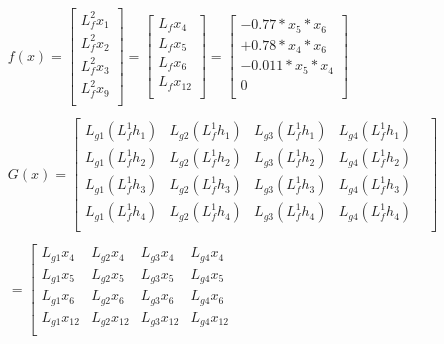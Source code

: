 \documentclass[varwidth,margin=3mm]{standalone}
\begin{document}
\begin{gather*}
	f(x) = \left [ 
	\begin{matrix}
		L^2_fx_1\\
		L^2_fx_2\\
		L^2_fx_3\\
		L^2_fx_9\\
	\end{matrix}
	\right ]
	= \left [ 
	\begin{matrix}
		L_fx_4\\
		L_fx_5\\
		L_fx_6\\
		L_fx_{12}\\
	\end{matrix}
	\right ]
	= \left [ 
	\begin{matrix}
		- 0.77*x_5*x_6\\
		+ 0.78*x_4*x_6\\
		- 0.011*x_5*x_4\\
		0\\
	\end{matrix}
	\right ]
	\\
	\\
	G(x) = 
	\left [ 
	\begin{matrix}
		L_{g{1}}\left(L^{1}_fh_1\right)  & L_{g{2}}\left(L^{1}_fh_1\right) & L_{g{3}}\left(L^{1}_fh_1\right)& L_{g{4}}\left(L^{1}_fh_1\right)  & \\
		L_{g{1}}\left(L^{1}_fh_2\right)  & L_{g{2}}\left(L^{1}_fh_2\right) & L_{g{3}}\left(L^{1}_fh_2\right)& L_{g{4}}\left(L^{1}_fh_2\right)  & \\
		L_{g{1}}\left(L^{1}_fh_3\right)  & L_{g{2}}\left(L^{1}_fh_3\right) & L_{g{3}}\left(L^{1}_fh_3\right)& L_{g{4}}\left(L^{1}_fh_3\right)  & \\
		L_{g{1}}\left(L^{1}_fh_4\right)  & L_{g{2}}\left(L^{1}_fh_4\right) & L_{g{3}}\left(L^{1}_fh_4\right)& L_{g{4}}\left(L^{1}_fh_4\right)  & \\
	\end{matrix}
	\right ]
	\\
	\\
	= 
	\left [ 
	\begin{matrix}
		L_{g{1}}x_4  & L_{g{2}}x_4 & L_{g{3}}x_4& L_{g{4}}x_4  & \\
		L_{g{1}}x_5  & L_{g{2}}x_5 & L_{g{3}}x_5& L_{g{4}}x_5  & \\
		L_{g{1}}x_6  & L_{g{2}}x_6 & L_{g{3}}x_6& L_{g{4}}x_6  & \\
		L_{g{1}}x_{12}  & L_{g{2}}x_{12} & L_{g{3}}x_{12}& L_{g{4}}x_{12}  & \\

\end{matrix}
\end{gather*}
\end{document}
